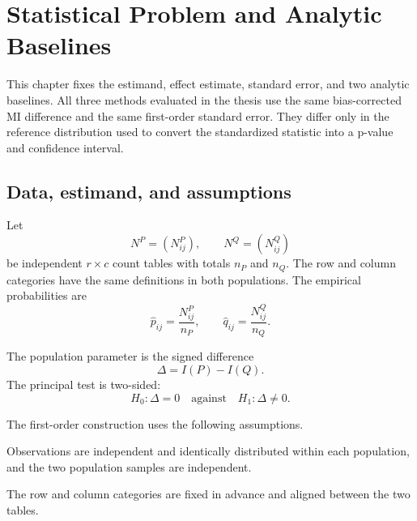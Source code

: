 \chapter{Statistical Problem and Analytic Baselines}
\label{chap:baselines}

This chapter fixes the estimand, effect estimate, standard error, and two
analytic baselines. All three methods evaluated in the thesis use the same
bias-corrected MI difference and the same first-order standard error. They
differ only in the reference distribution used to convert the standardized
statistic into a p-value and confidence interval.

\section{Data, estimand, and assumptions}

Let
\begin{equation}
  N^P=(N^P_{ij}),
  \qquad
  N^Q=(N^Q_{ij})
\end{equation}
be independent \(r\times c\) count tables with totals \(n_P\) and \(n_Q\).
The row and column categories have the same definitions in both populations.
The empirical probabilities are
\begin{equation}
  \widehat p_{ij}=\frac{N^P_{ij}}{n_P},
  \qquad
  \widehat q_{ij}=\frac{N^Q_{ij}}{n_Q}.
\end{equation}

The population parameter is the signed difference
\begin{equation}
  \Delta=I(P)-I(Q).
  \label{eq:delta-population}
\end{equation}
The principal test is two-sided:
\begin{equation}
  H_0:\Delta=0
  \quad\text{against}\quad
  H_1:\Delta\ne0.
  \label{eq:two-sample-null}
\end{equation}

The first-order construction uses the following assumptions.

\begin{assumption}[Sampling]
Observations are independent and identically distributed within each
population, and the two population samples are independent.
\end{assumption}

\begin{assumption}
The row and column categories are fixed in advance and aligned between the two
tables.
\end{assumption}

